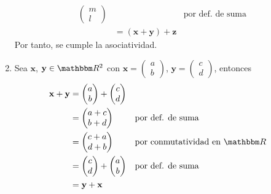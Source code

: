 \begin{examplebox}{}{}
\begin{enumerate}[label=\roman*), topsep=6pt, itemsep=0pt]
\begin{align*}
\begin{pmatrix}
                m \\
                l
            \end{pmatrix} && \text{por def. de suma} \\
            & = (\mathbf{x} + \mathbf{y}) + \mathbf{z}
        \end{align*}
        Por tanto, se cumple la asociatividad.
        \item Sea $\mathbf{x}$, $\mathbf{y} \in \RR[2]$ con $\mathbf{x} = \begin{pmatrix}
            a \\
            b
        \end{pmatrix}$, $\mathbf{y} = \begin{pmatrix}
            c \\
            d
        \end{pmatrix}$, entonces
        \begin{align*}
            \mathbf{x} + \mathbf{y} & = \begin{pmatrix}
                a \\
                b
            \end{pmatrix} + \begin{pmatrix}
                c \\
                d
            \end{pmatrix} \\
            & = \begin{pmatrix}
                a + c \\
                b + d
            \end{pmatrix} && \text{por def. de suma} \\
            & = \begin{pmatrix}
                c + a \\
                d + b
            \end{pmatrix} && \text{por conmutatividad en $\RR$} \\
            & = \begin{pmatrix}
                c \\
                d
            \end{pmatrix} + \begin{pmatrix}
                a \\
                b
            \end{pmatrix} && \text{por def. de suma} \\
            & = \mathbf{y} + \mathbf{x}
        \end{align*}

\end{enumerate}
\end{examplebox}
